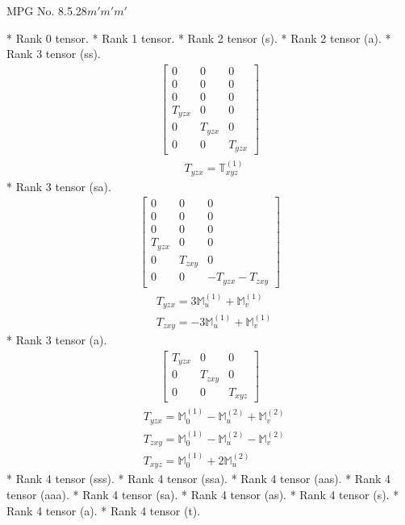 \documentclass[fleqn,8pt,landscape]{jsarticle}
\begin{document}
\setcounter{MaxMatrixCols}{32}

\renewcommand{\tablename}{Table~}
\renewcommand{\figurename}{Figure~}
\begin{center}
\LARGE
MPG No. 8.5.28\quad$m'm'm'$
\end{center}
* Rank 0 tensor.
* Rank 1 tensor.
* Rank 2 tensor (s).
* Rank 2 tensor (a).
* Rank 3 tensor (ss).
\begin{align*}
\begin{bmatrix} 0 & 0 & 0 \\ 0 & 0 & 0 \\ 0 & 0 & 0 \\ T_{yzx} & 0 & 0 \\ 0 & T_{yzx} & 0 \\ 0 & 0 & T_{yzx} \end{bmatrix}
\end{align*}
\begin{align*}
& T_{yzx} = \mathbb{T}_{xyz}^{(1)}
\end{align*}
* Rank 3 tensor (sa).
\begin{align*}
\begin{bmatrix} 0 & 0 & 0 \\ 0 & 0 & 0 \\ 0 & 0 & 0 \\ T_{yzx} & 0 & 0 \\ 0 & T_{zxy} & 0 \\ 0 & 0 & - T_{yzx} - T_{zxy} \end{bmatrix}
\end{align*}
\begin{align*}
& T_{yzx} = 3 \mathbb{M}_{u}^{(1)} + \mathbb{M}_{v}^{(1)} \\
& T_{zxy} = - 3 \mathbb{M}_{u}^{(1)} + \mathbb{M}_{v}^{(1)}
\end{align*}
* Rank 3 tensor (a).
\begin{align*}
\begin{bmatrix} T_{yzx} & 0 & 0 \\ 0 & T_{zxy} & 0 \\ 0 & 0 & T_{xyz} \end{bmatrix}
\end{align*}
\begin{align*}
& T_{yzx} = \mathbb{M}_{0}^{(1)} - \mathbb{M}_{u}^{(2)} + \mathbb{M}_{v}^{(2)} \\
& T_{zxy} = \mathbb{M}_{0}^{(1)} - \mathbb{M}_{u}^{(2)} - \mathbb{M}_{v}^{(2)} \\
& T_{xyz} = \mathbb{M}_{0}^{(1)} + 2 \mathbb{M}_{u}^{(2)}
\end{align*}
* Rank 4 tensor (sss).
* Rank 4 tensor (ssa).
* Rank 4 tensor (aas).
* Rank 4 tensor (aaa).
* Rank 4 tensor (sa).
* Rank 4 tensor (as).
* Rank 4 tensor (s).
* Rank 4 tensor (a).
* Rank 4 tensor (t).
\end{document}
